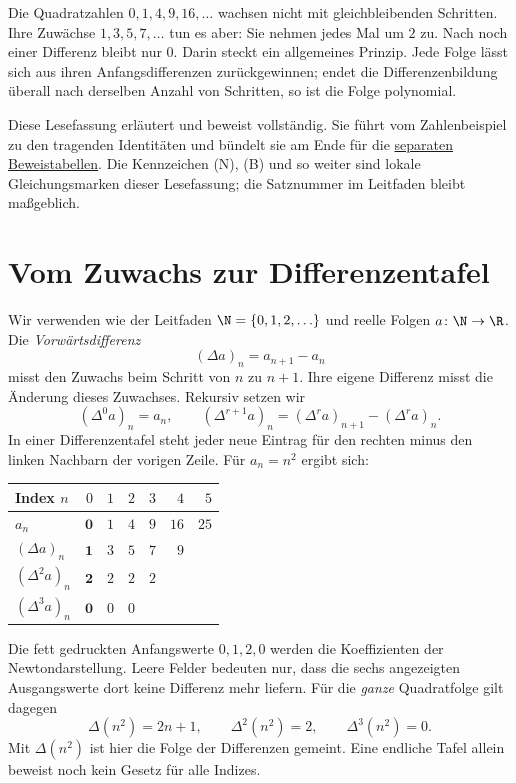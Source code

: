 Die Quadratzahlen $0,1,4,9,16,\ldots$ wachsen nicht mit gleichbleibenden
Schritten. Ihre Zuwächse $1,3,5,7,\ldots$ tun es aber: Sie nehmen
jedes Mal um $2$ zu. Nach noch einer Differenz bleibt nur $0$.
Darin steckt ein allgemeines Prinzip. Jede Folge lässt sich aus ihren
Anfangsdifferenzen zurückgewinnen; endet die Differenzenbildung überall
nach derselben Anzahl von Schritten, so ist die Folge polynomial.

Diese Lesefassung erläutert und beweist \GuideLink{} vollständig.
Sie führt vom Zahlenbeispiel zu den tragenden Identitäten und bündelt sie
am Ende für die \href{_B21-newton-proofs.pdf\#newton.proofs}{separaten Beweistabellen}. Die Kennzeichen (N), (B) und
so weiter sind lokale Gleichungsmarken dieser Lesefassung; die
Satznummer im Leitfaden bleibt maßgeblich.

\section{Vom Zuwachs zur Differenzentafel}

Wir verwenden wie der Leitfaden $\N=\{0,1,2,\ldots\}$ und reelle Folgen
$a\colon\N\to\R$. Die \emph{Vorwärtsdifferenz}
\[
 (\Delta a)_n=a_{n+1}-a_n
\]
misst den Zuwachs beim Schritt von $n$ zu $n+1$. Ihre eigene Differenz
misst die Änderung dieses Zuwachses. Rekursiv setzen wir
\[
 (\Delta^0a)_n=a_n,\qquad
 (\Delta^{r+1}a)_n=(\Delta^ra)_{n+1}-(\Delta^ra)_n.
\]
In einer Differenzentafel steht jeder neue Eintrag für den rechten
minus den linken Nachbarn der vorigen Zeile. Für $a_n=n^2$ ergibt sich:
\begin{center}
\begin{tabular}{@{}lrrrrrr@{}}
\toprule
Index $n$ & $0$ & $1$ & $2$ & $3$ & $4$ & $5$\\
\midrule
$a_n$              & $\mathbf 0$ & $1$ & $4$ & $9$ & $16$ & $25$\\
$(\Delta a)_n$     & $\mathbf 1$ & $3$ & $5$ & $7$ & $9$ &\\
$(\Delta^2 a)_n$   & $\mathbf 2$ & $2$ & $2$ & $2$ & &\\
$(\Delta^3 a)_n$   & $\mathbf 0$ & $0$ & $0$ & & &\\
\bottomrule
\end{tabular}
\end{center}
Die fett gedruckten Anfangswerte $0,1,2,0$ werden die Koeffizienten
der Newtondarstellung. Leere Felder bedeuten nur, dass die sechs
angezeigten Ausgangswerte dort keine Differenz mehr liefern.
Für die \emph{ganze} Quadratfolge gilt dagegen
\[
 \Delta(n^2)=2n+1,\qquad \Delta^2(n^2)=2,\qquad \Delta^3(n^2)=0.
\]
Mit $\Delta(n^2)$ ist hier die Folge der Differenzen gemeint.
Eine endliche Tafel allein beweist noch kein Gesetz für alle Indizes.

